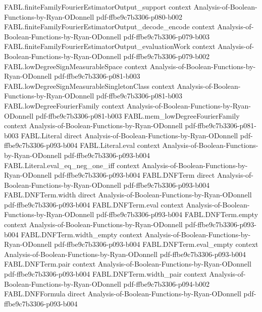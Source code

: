 \begin{theorem}
  {FABL.finiteFamilyFourierEstimatorOutput_support}
  {context}
  {Analysis-of-Boolean-Functions-by-Ryan-ODonnell}
  {pdf-ffbe9c7b3306-p080-b002}
\proofstep
  {FABL.finiteFamilyFourierEstimatorOutput_decode_encode}
  {context}
  {Analysis-of-Boolean-Functions-by-Ryan-ODonnell}
  {pdf-ffbe9c7b3306-p079-b003}
\proofstep
  {FABL.finiteFamilyFourierEstimatorOutput_evaluationWork}
  {context}
  {Analysis-of-Boolean-Functions-by-Ryan-ODonnell}
  {pdf-ffbe9c7b3306-p079-b002}
\proofstep
  {FABL.lowDegreeSignMeasurableSpace}
  {context}
  {Analysis-of-Boolean-Functions-by-Ryan-ODonnell}
  {pdf-ffbe9c7b3306-p081-b003}
\proofstep
  {FABL.lowDegreeSignMeasurableSingletonClass}
  {context}
  {Analysis-of-Boolean-Functions-by-Ryan-ODonnell}
  {pdf-ffbe9c7b3306-p081-b003}
\proofstep
  {FABL.lowDegreeFourierFamily}
  {context}
  {Analysis-of-Boolean-Functions-by-Ryan-ODonnell}
  {pdf-ffbe9c7b3306-p081-b003}
\proofstep
  {FABL.mem_lowDegreeFourierFamily}
  {context}
  {Analysis-of-Boolean-Functions-by-Ryan-ODonnell}
  {pdf-ffbe9c7b3306-p081-b003}
\proofstep
  {FABL.Literal}
  {direct}
  {Analysis-of-Boolean-Functions-by-Ryan-ODonnell}
  {pdf-ffbe9c7b3306-p093-b004}
\proofstep
  {FABL.Literal.eval}
  {context}
  {Analysis-of-Boolean-Functions-by-Ryan-ODonnell}
  {pdf-ffbe9c7b3306-p093-b004}
\proofstep
  {FABL.Literal.eval_eq_neg_one_iff}
  {context}
  {Analysis-of-Boolean-Functions-by-Ryan-ODonnell}
  {pdf-ffbe9c7b3306-p093-b004}
\proofstep
  {FABL.DNFTerm}
  {direct}
  {Analysis-of-Boolean-Functions-by-Ryan-ODonnell}
  {pdf-ffbe9c7b3306-p093-b004}
\proofstep
  {FABL.DNFTerm.width}
  {direct}
  {Analysis-of-Boolean-Functions-by-Ryan-ODonnell}
  {pdf-ffbe9c7b3306-p093-b004}
\proofstep
  {FABL.DNFTerm.eval}
  {context}
  {Analysis-of-Boolean-Functions-by-Ryan-ODonnell}
  {pdf-ffbe9c7b3306-p093-b004}
\proofstep
  {FABL.DNFTerm.empty}
  {context}
  {Analysis-of-Boolean-Functions-by-Ryan-ODonnell}
  {pdf-ffbe9c7b3306-p093-b004}
\proofstep
  {FABL.DNFTerm.width_empty}
  {context}
  {Analysis-of-Boolean-Functions-by-Ryan-ODonnell}
  {pdf-ffbe9c7b3306-p093-b004}
\proofstep
  {FABL.DNFTerm.eval_empty}
  {context}
  {Analysis-of-Boolean-Functions-by-Ryan-ODonnell}
  {pdf-ffbe9c7b3306-p093-b004}
\proofstep
  {FABL.DNFTerm.pair}
  {context}
  {Analysis-of-Boolean-Functions-by-Ryan-ODonnell}
  {pdf-ffbe9c7b3306-p093-b004}
\proofstep
  {FABL.DNFTerm.width_pair}
  {context}
  {Analysis-of-Boolean-Functions-by-Ryan-ODonnell}
  {pdf-ffbe9c7b3306-p094-b002}
\proofstep
  {FABL.DNFFormula}
  {direct}
  {Analysis-of-Boolean-Functions-by-Ryan-ODonnell}
  {pdf-ffbe9c7b3306-p093-b004}
\proofstep

\end{theorem}
